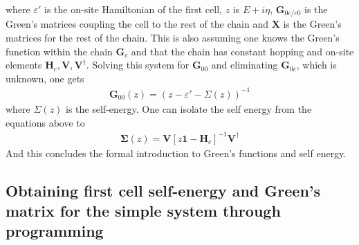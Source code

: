 where \(\varepsilon'\) is the on-site Hamiltonian of the first cell, \(z\) is \(E+i\eta\),  \(\mathbf{G}_{0c/c0}\) is the Green's matrices coupling the cell to the rest of the chain and \(\mathbf{X}\) is the Green's matrices for the rest of the chain. This is also assuming one knows the Green's function within the chain \(\mathbf{G}_c\) and that the chain has constant hopping and on-site elements \(\mathbf{H}_c,\mathbf{V},\mathbf{V}^{\dagger}\). 
Solving this system for \(\mathbf{G}_{00}\) and eliminating \(\mathbf{G}_{0c}\), which is unknown, one gets
\begin{align}\label{greenszero}
    \mathbf{G}_{00}(z) = (z-\varepsilon'-\Sigma(z))^{-1}
\end{align}
where \(\Sigma(z)\) is the self-energy. One can isolate the self energy from the equations above to
\begin{align}
    \mathbf{\Sigma}(z) = \mathbf{V}[z\mathbf{1}-\mathbf{H}_c]^{-1}\mathbf{V}^{\dagger}
\end{align}
And this concludes the formal introduction to Green's functions and self energy.\subsection{Obtaining first cell self-energy and Green's matrix  for the simple system through programming}\label{recursionroutinesec}
